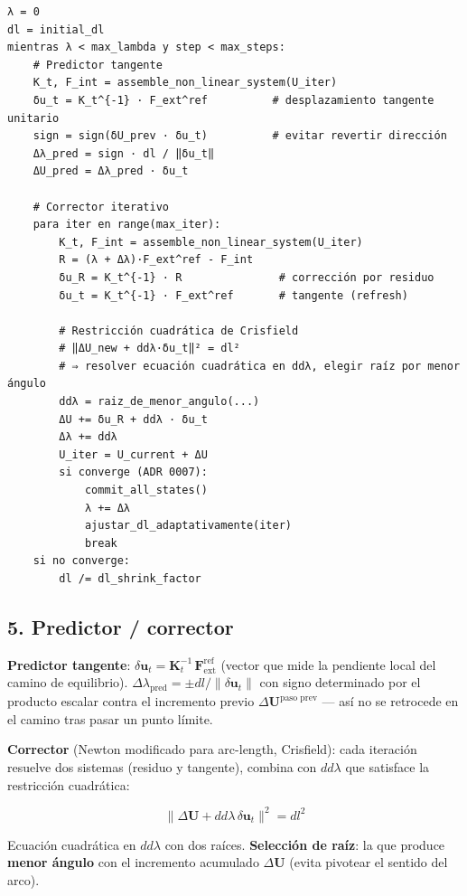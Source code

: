\documentclass[11pt,letterpaper,oneside]{report}
\begin{document}
\begin{lstlisting}
λ = 0
dl = initial_dl
mientras λ < max_lambda y step < max_steps:
    # Predictor tangente
    K_t, F_int = assemble_non_linear_system(U_iter)
    δu_t = K_t^{-1} · F_ext^ref          # desplazamiento tangente unitario
    sign = sign(δU_prev · δu_t)          # evitar revertir dirección
    Δλ_pred = sign · dl / ‖δu_t‖
    ΔU_pred = Δλ_pred · δu_t

    # Corrector iterativo
    para iter en range(max_iter):
        K_t, F_int = assemble_non_linear_system(U_iter)
        R = (λ + Δλ)·F_ext^ref - F_int
        δu_R = K_t^{-1} · R               # corrección por residuo
        δu_t = K_t^{-1} · F_ext^ref       # tangente (refresh)

        # Restricción cuadrática de Crisfield
        # ‖ΔU_new + ddλ·δu_t‖² = dl²
        # ⇒ resolver ecuación cuadrática en ddλ, elegir raíz por menor ángulo
        ddλ = raiz_de_menor_angulo(...)
        ΔU += δu_R + ddλ · δu_t
        Δλ += ddλ
        U_iter = U_current + ΔU
        si converge (ADR 0007):
            commit_all_states()
            λ += Δλ
            ajustar_dl_adaptativamente(iter)
            break
    si no converge:
        dl /= dl_shrink_factor

\end{lstlisting}

\subsection{5. Predictor / corrector}

\textbf{Predictor tangente}: $\delta\mathbf u_t = \mathbf K_t^{-1}\,\mathbf F_{\text{ext}}^{\text{ref}}$ (vector que mide la pendiente local del camino de equilibrio). $\Delta\lambda_{\text{pred}} = \pm dl / \lVert\delta\mathbf u_t\rVert$ con signo determinado por el producto escalar contra el incremento previo $\Delta\mathbf U^{\text{paso prev}}$ --- así no se retrocede en el camino tras pasar un punto límite.

\textbf{Corrector} (Newton modificado para arc-length, Crisfield): cada iteración resuelve dos sistemas (residuo y tangente), combina con $dd\lambda$ que satisface la restricción cuadrática:

\[
\lVert\Delta\mathbf U + dd\lambda\,\delta\mathbf u_t\rVert^2 = dl^2
\]

Ecuación cuadrática en $dd\lambda$ con dos raíces. \textbf{Selección de raíz}: la que produce \textbf{menor ángulo} con el incremento acumulado $\Delta\mathbf U$ (evita pivotear el sentido del arco).
\end{document}
